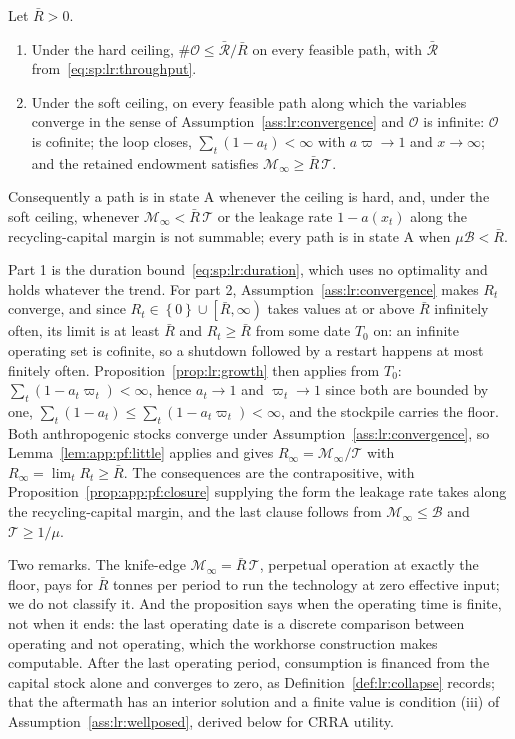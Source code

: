 \begin{proposition}\label{prop:app:pf:finite}
Let $\bar R>0$.
\begin{enumerate}
\item Under the hard ceiling, $\#\mathcal O\le\bar{\mathcal R}/\bar R$ on every feasible path, with $\bar{\mathcal R}$ from~\eqref{eq:sp:lr:throughput}.
\item Under the soft ceiling, on every feasible path along which the variables converge in the sense of Assumption~\ref{ass:lr:convergence} and $\mathcal O$ is infinite: $\mathcal O$ is cofinite; the loop closes, $\sum_t\left(1-a_t\right)<\infty$ with $a\varpi\to1$ and $x\to\infty$; and the retained endowment satisfies $\mathcal M_\infty\ge\bar R\,\mathcal T$.
\end{enumerate}
Consequently a path is in state A whenever the ceiling is hard, and, under the soft ceiling, whenever $\mathcal M_\infty<\bar R\,\mathcal T$ or the leakage rate $1-a\left(x_t\right)$ along the recycling-capital margin is not summable; every path is in state A when $\mu\mathcal B<\bar R$.
\end{proposition}

Part 1 is the duration bound~\eqref{eq:sp:lr:duration}, which uses no optimality and holds whatever the trend. For part 2, Assumption~\ref{ass:lr:convergence} makes $R_t$ converge, and since $R_t\in\left\{0\right\}\cup\left[\bar R,\infty\right)$ takes values at or above $\bar R$ infinitely often, its limit is at least $\bar R$ and $R_t\ge\bar R$ from some date $T_0$ on: an infinite operating set is cofinite, so a shutdown followed by a restart happens at most finitely often. Proposition~\ref{prop:lr:growth} then applies from $T_0$: $\sum_t\left(1-a_t\varpi_t\right)<\infty$, hence $a_t\to1$ and $\varpi_t\to1$ since both are bounded by one, $\sum_t\left(1-a_t\right)\le\sum_t\left(1-a_t\varpi_t\right)<\infty$, and the stockpile carries the floor. Both anthropogenic stocks converge under Assumption~\ref{ass:lr:convergence}, so Lemma~\ref{lem:app:pf:little} applies and gives $R_\infty=\mathcal M_\infty/\mathcal T$ with $R_\infty=\lim_tR_t\ge\bar R$. The consequences are the contrapositive, with Proposition~\ref{prop:app:pf:closure} supplying the form the leakage rate takes along the recycling-capital margin, and the last clause follows from $\mathcal M_\infty\le\mathcal B$ and $\mathcal T\ge1/\mu$.

Two remarks. The knife-edge $\mathcal M_\infty=\bar R\,\mathcal T$, perpetual operation at exactly the floor, pays for $\bar R$ tonnes per period to run the technology at zero effective input; we do not classify it. And the proposition says when the operating time is finite, not when it ends: the last operating date is a discrete comparison between operating and not operating, which the workhorse construction makes computable. After the last operating period, consumption is financed from the capital stock alone and converges to zero, as Definition~\ref{def:lr:collapse} records; that the aftermath has an interior solution and a finite value is condition (iii) of Assumption~\ref{ass:lr:wellposed}, derived below for CRRA utility.

